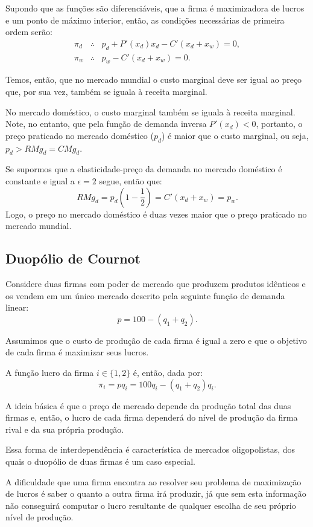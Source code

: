 \documentclass[preprintnumbers,nofootinbib,amsmath,amssymb,12pt]{article}
\begin{document}
Supondo que as funções são diferenciáveis, que a firma é maximizadora de lucros e um ponto de máximo interior, então, as condições necessárias de primeira ordem serão:
\begin{eqnarray*}
\pi_d &\therefore& p_d + P'(x_d)x_d - C'(x_d + x_w) = 0, \\
\pi_w &\therefore& p_w - C'(x_d + x_w) = 0.
\end{eqnarray*}

Temos, então, que no mercado mundial o custo marginal deve ser igual ao preço que, por sua vez, também se iguala à receita marginal.

No mercado doméstico, o custo marginal também se iguala à receita marginal. Note, no entanto, que pela função de demanda inversa $P'(x_d) < 0$, portanto, o preço praticado no mercado doméstico ($p_d$) é maior que o custo marginal, ou seja, $p_d > RMg_d = CMg_d$.

Se supormos que a elasticidade-preço da demanda no mercado doméstico é constante e igual a $\epsilon = 2$ segue, então que:
\[
RMg_d = p_d\left(1 - \frac{1}{2}\right) = C'(x_d + x_w) = p_w.
\]
Logo, o preço no mercado doméstico é duas vezes maior que o preço praticado no mercado mundial.
\newpage
\subsection{Duopólio de Cournot}
Considere duas firmas com poder de mercado que produzem produtos idênticos e os vendem em um único mercado descrito pela seguinte função de demanda linear:
\[
p = 100 - (q_1 + q_2).
\]

Assumimos que o custo de produção de cada firma é igual a zero e que o objetivo de cada firma é maximizar seus lucros.

A função lucro da firma $i \in \{1, 2\}$ é, então, dada por:
\[
\pi_i = pq_i = 100q_i - (q_1 + q_2)q_i.
\]

A ideia básica é que o preço de mercado depende da produção total das duas firmas e, então, o lucro de cada firma dependerá do nível de produção da firma rival e da sua própria produção.

Essa forma de interdependência é característica de mercados oligopolistas, dos quais o duopólio de duas firmas é um caso especial.

A dificuldade que uma firma encontra ao resolver seu problema de maximização de lucros é saber o quanto a outra firma irá produzir, já que sem esta informação não conseguirá computar o lucro resultante de qualquer escolha de seu próprio nível de produção.
\end{document}
